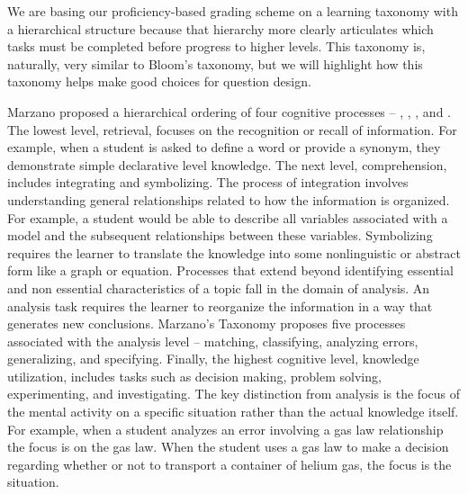 \documentclass[10pt,letterpaper]{article}
\begin{document}
 We are basing our  proficiency-based grading scheme on a learning taxonomy with a hierarchical structure because that hierarchy more clearly articulates which tasks must be completed before progress to higher levels. This taxonomy is, naturally, very similar to Bloom's taxonomy, but we will highlight how this taxonomy helps make good choices for question design.

Marzano proposed a hierarchical ordering of four cognitive processes -- \recall, \comprehension, \analysis, and \use  \citep{Marzano2006}. The lowest level, retrieval, focuses on the recognition or recall of information. For example, when a student is asked to define a word or provide a synonym, they demonstrate simple declarative level knowledge. The next level, comprehension, includes integrating and symbolizing. The process of integration involves understanding general relationships related to how the information is organized. For example, a student would be able to describe all variables associated with a model and the subsequent relationships between these variables. Symbolizing requires the learner to translate the knowledge into some nonlinguistic or abstract form like a graph or equation. Processes that extend beyond identifying essential and non essential characteristics of a topic fall in the domain of analysis. An analysis task requires the learner to reorganize the information in a way that generates new conclusions. Marzano's Taxonomy proposes five processes associated with the analysis level -- matching, classifying, analyzing errors, generalizing, and specifying. Finally, the highest cognitive level, knowledge utilization, includes tasks such as decision making, problem solving, experimenting, and investigating. The key distinction from analysis is the focus of the mental activity on a specific situation rather than the actual knowledge itself. For example, when a student analyzes an error involving a gas law relationship the focus is on the gas law. When the student uses a gas law to make a decision regarding whether or not to transport a container of helium gas, the focus is the situation. 

\end{document}
